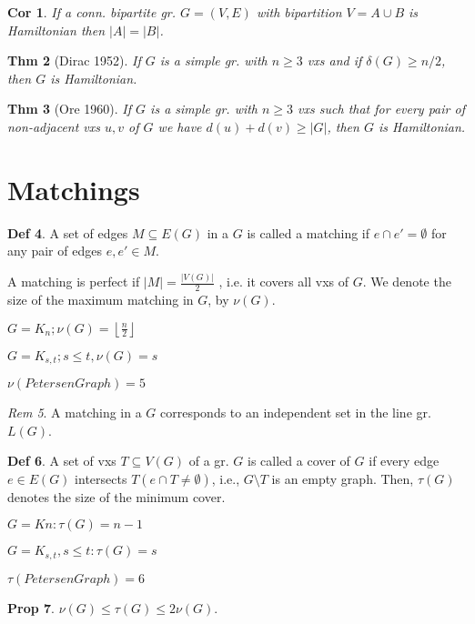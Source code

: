 \documentclass[11pt, fleqn, a4paper, landscape]{article}
\theoremstyle{plain} %
\newtheorem{thm}{Thm}
\newtheorem{pro}[thm]{Prop}
\newtheorem{cor}[thm]{Cor}
\theoremstyle{remark} %
\newtheorem{rem}[thm]{Rem}
\theoremstyle{definition} %
\newtheorem{defi}[thm]{Def}
\begin{document}
\begin{multicols}{5}
\begin{cor}
If a conn. bipartite gr. $G = (V,E)$ with bipartition $V = A\cup B$ is Hamiltonian then $|A|=|B|$.
\end{cor}
\addtocounter{thm}{1}
\begin{thm}[Dirac 1952]
If $G$ is a simple gr. with $n \ge 3$ vxs and if $\delta(G) \ge n/2$, then $G$ is Hamiltonian.
\end{thm}
\addtocounter{thm}{1}
\begin{thm}[Ore 1960]
If $G$ is a simple gr. with $n\ge 3$ vxs such that for every pair of
non-adjacent vxs $u, v$ of $G$ we have $d(u) + d(v)\ge |G|$, then $G $ is Hamiltonian.
\end{thm}
\section{Matchings}
\begin{defi}
A set of edges $M \subseteq E(G)$ in a $G$ is called a matching if $e \cap e' = \emptyset$ for any pair of edges $e, e' \in M$.

A matching is perfect if $|M|=\frac{|V (G)|}{2}$ , i.e. it covers all vxs of $G$. We denote the size of the maximum matching in $G$, by $\nu(G)$.

$G=K_n; \nu(G)=\left\lfloor\frac{n}{2}\right\rfloor$

$G=K_{s,t}; s\le t, \nu(G)=s$

$\nu(Petersen Graph)=5$
\end{defi}
\addtocounter{thm}{1}
\begin{rem}
A matching in a $G$ corresponds to an independent set in the line gr. $L(G)$.
\end{rem}
\begin{defi}
A set of vxs $T \subseteq V (G)$ of a gr.  $G$ is called a cover of $G$ if every edge $e \in E(G)$ intersects $T (e \cap T \neq \emptyset)$, i.e., $G \setminus T$ is an empty graph. Then, $\tau(G)$ denotes the size of
the minimum cover.

$G = Kn: \tau(G) = n - 1$

$G = K_{s,t}, s \le t: \tau(G) = s$

$\tau(Petersen Graph)=6$
\end{defi}
\addtocounter{thm}{1}
\begin{pro}
$\nu(G) \le\tau(G) \le 2\nu(G).$
\end{pro}
\addtocounter{subsection}{1}

\end{multicols}
\end{document}
